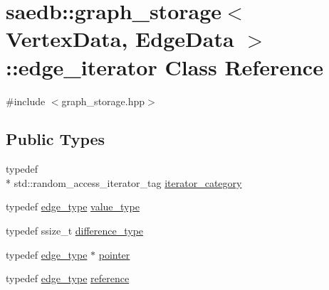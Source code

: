 \hypertarget{classsaedb_1_1graph__storage_1_1edge__iterator}{\section{saedb\-:\-:graph\-\_\-storage$<$ Vertex\-Data, Edge\-Data $>$\-:\-:edge\-\_\-iterator Class Reference}
\label{d8/d8a/classsaedb_1_1graph__storage_1_1edge__iterator}
}


{\ttfamily \#include $<$graph\-\_\-storage.\-hpp$>$}

\subsection*{Public Types}
\begin{DoxyCompactItemize}
\item 
typedef \\*
std\-::random\-\_\-access\-\_\-iterator\-\_\-tag \hyperlink{classsaedb_1_1graph__storage_1_1edge__iterator_a4fac79a017431f05a075583324643f7e}{iterator\-\_\-category}
\item 
typedef \hyperlink{classsaedb_1_1graph__storage_1_1edge__type}{edge\-\_\-type} \hyperlink{classsaedb_1_1graph__storage_1_1edge__iterator_acd702148975e7e70c037eb2eade2c42e}{value\-\_\-type}
\item 
typedef ssize\-\_\-t \hyperlink{classsaedb_1_1graph__storage_1_1edge__iterator_a36e4780cec6028b4af8cb4e34b8de5b4}{difference\-\_\-type}
\item 
typedef \hyperlink{classsaedb_1_1graph__storage_1_1edge__type}{edge\-\_\-type} $\ast$ \hyperlink{classsaedb_1_1graph__storage_1_1edge__iterator_a387ef43e028c606818c1eff451f33d1c}{pointer}
\item 
typedef \hyperlink{classsaedb_1_1graph__storage_1_1edge__type}{edge\-\_\-type} \hyperlink{classsaedb_1_1graph__storage_1_1edge__iterator_a2f581a4c04f23e1dab137fb7ec5f1e75}{reference}
\end{DoxyCompactItemize}
